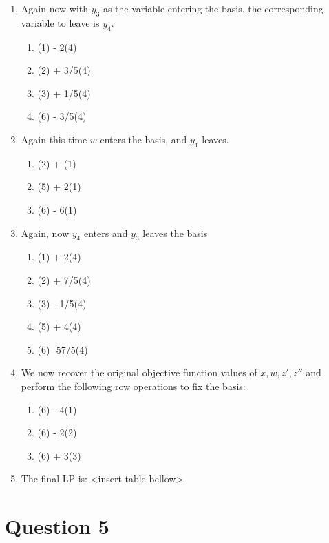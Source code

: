 \documentclass{article}
\numberwithin{equation}{subsection}
\begin{document}
\begin{enumerate}
		\item Again now with $y_3$ as the variable entering the basis, the corresponding 
			variable to leave is $y_4$.

			\begin{enumerate}
				\item (1) - 2(4)  
				\item (2) + 3/5(4)  
				\item (3) + 1/5(4)  
				\item (6) - 3/5(4)  
			\end{enumerate}

		\item Again this time $w$ enters the basis, and $y_1$ leaves. 
			\begin{enumerate}
				\item (2) + (1)
				\item (5) + 2(1)
				\item (6) - 6(1)
			\end{enumerate}


		\item Again, now $y_4$ enters and $y_3$ leaves the basis 
			\begin{enumerate}
				\item (1) + 2(4) 
				\item (2) + 7/5(4) 
				\item (3) - 1/5(4) 
				\item (5) + 4(4) 
				\item (6) -57/5(4) 
			\end{enumerate}

		\item We now recover the original objective function values of $x,w,z',z''$ and 
			perform the following row operations to fix the basis:
			\begin{enumerate}
				\item (6) - 4(1)
				\item (6) - 2(2)
				\item (6) + 3(3)	
			\end{enumerate}

		\item The final LP is: <insert table bellow>
	\end{enumerate}


	\newpage
	\section{Question 5}
\end{document}
